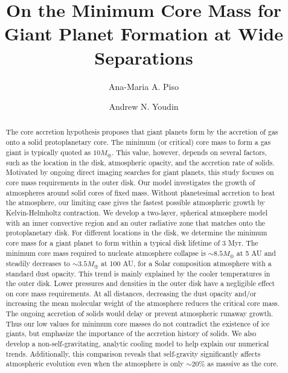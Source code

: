 \documentclass[apj, numberedappendix]{emulateapj}
\begin{document}



\title{On the Minimum Core Mass for Giant Planet Formation at Wide Separations}

\author{Ana-Maria A. Piso}

\author{Andrew N. Youdin}


\begin{abstract}

The core accretion hypothesis proposes that giant planets form by the accretion of gas onto a solid protoplanetary core. The minimum (or critical) core mass to form a gas giant is typically quoted as $10 M_{\oplus}$. This value, however, depends on several factors, such as the location in the disk, atmospheric opacity, and the accretion rate of solids.  Motivated by ongoing direct imaging searches for giant planets, this study focuses on core mass requirements in the outer disk.
Our model investigates the growth of atmospheres around solid cores of fixed mass.  Without planetesimal accretion to heat the atmosphere, our limiting case gives the fastest possible atmospheric growth by Kelvin-Helmholtz contraction. We develop a two-layer, spherical atmosphere model with an inner convective region and an outer radiative zone that matches onto the protoplanetary disk.  For different locations in the disk, we determine the minimum core mass for a giant planet to form within a typical disk lifetime of 3 Myr.   The minimum core mass required to nucleate atmosphere collapse is $\sim$$8.5 M_{\oplus}$ at 5 AU and steadily decreases to $\sim$$3.5 M_{\oplus}$ at 100 AU, for a Solar composition atmosphere with a standard dust opacity.   This trend is mainly explained by the cooler temperatures in the outer disk. Lower pressures and densities in the outer disk have a negligible effect on core mass requirements.  At all distances, decreasing the dust opacity and/or increasing the mean molecular weight of the atmosphere reduces the critical core mass.   The ongoing accretion of solids would delay or prevent atmospheric runaway growth.  Thus our low values for minimum core masses do not contradict the existence of ice giants, but emphasize the importance of the accretion history of solids.  We also develop a non-self-gravitating, analytic cooling model to help explain our numerical trends.  Additionally, this comparison reveals that self-gravity significantly affects atmospheric evolution even when the atmosphere is only $\sim$$20\%$ as massive as the core.

\end{abstract}
\end{document}
